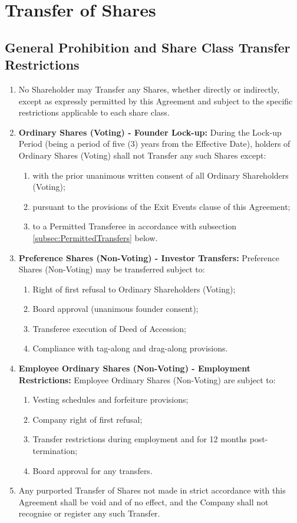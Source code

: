 \section{Transfer of Shares}

\subsection{General Prohibition and Share Class Transfer Restrictions}
\begin{enumerate}[label=(\alph*)]
\item No Shareholder may Transfer any Shares, whether directly or indirectly, except as expressly permitted by this Agreement and subject to the specific restrictions applicable to each share class.
\item \textbf{Ordinary Shares (Voting) - Founder Lock-up:} During the Lock-up Period (being a period of five (3) years from the Effective Date), holders of Ordinary Shares (Voting) shall not Transfer any such Shares except:
    \begin{enumerate}[label=(\roman*)]
    \item with the prior unanimous written consent of all Ordinary Shareholders (Voting);
    \item pursuant to the provisions of the Exit Events clause of this Agreement;
    \item to a Permitted Transferee in accordance with subsection \ref{subsec:PermittedTransfers} below.
    \end{enumerate}
\item \textbf{Preference Shares (Non-Voting) - Investor Transfers:} Preference Shares (Non-Voting) may be transferred subject to:
    \begin{enumerate}[label=(\roman*)]
    \item Right of first refusal to Ordinary Shareholders (Voting);
    \item Board approval (unanimous founder consent);
    \item Transferee execution of Deed of Accession;
    \item Compliance with tag-along and drag-along provisions.
    \end{enumerate}
\item \textbf{Employee Ordinary Shares (Non-Voting) - Employment Restrictions:} Employee Ordinary Shares (Non-Voting) are subject to:
    \begin{enumerate}[label=(\roman*)]
    \item Vesting schedules and forfeiture provisions;
    \item Company right of first refusal;
    \item Transfer restrictions during employment and for 12 months post-termination;
    \item Board approval for any transfers.
    \end{enumerate}
\item Any purported Transfer of Shares not made in strict accordance with this Agreement shall be void and of no effect, and the Company shall not recognise or register any such Transfer.
\end{enumerate}

